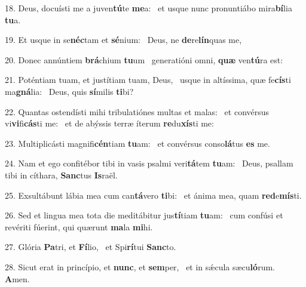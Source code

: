 18. Deus, docuísti me a juven\textbf{tú}te \textbf{me}a: \ast\  et usque nunc pronuntiábo mira\textbf{bí}lia \textbf{tu}a.\

19. Et usque in se\textbf{néc}tam et \textbf{sé}nium: \ast\  Deus, ne \textbf{de}re\textbf{lín}quas me,\

20. Donec annúntiem \textbf{brá}chium \textbf{tu}um \ast\  generatióni omni, \textbf{quæ} ven\textbf{tú}ra est:\

21. Poténtiam tuam, et justítiam tuam, Deus, \dag\  usque in altíssima, quæ fe\textbf{cís}ti ma\textbf{gná}lia: \ast\  Deus, quis \textbf{sí}milis \textbf{ti}bi?\

22. Quantas ostendísti mihi tribulatiónes multas et malas: \dag\  et convérsus vi\textbf{vi}fi\textbf{cás}ti me: \ast\  et de abýssis terræ íterum \textbf{re}du\textbf{xís}ti me:\

23. Multiplicásti magnifi\textbf{cén}tiam \textbf{tu}am: \ast\  et convérsus conso\textbf{lá}tus \textbf{es} me.\

24. Nam et ego confitébor tibi in vasis psalmi veri\textbf{tá}tem \textbf{tu}am: \ast\  Deus, psallam tibi in cíthara, \textbf{Sanc}tus \textbf{Is}raël.\

25. Exsultábunt lábia mea cum can\textbf{tá}vero \textbf{ti}bi: \ast\  et ánima mea, quam \textbf{red}e\textbf{mís}ti.\

26. Sed et lingua mea tota die meditábitur jus\textbf{tí}tiam \textbf{tu}am: \ast\  cum confúsi et revériti fúerint, qui quærunt \textbf{ma}la \textbf{mi}hi.\

27. Glória \textbf{Pa}tri, et \textbf{Fí}lio, \ast\  et Spi\textbf{rí}tui \textbf{Sanc}to.\

28. Sicut erat in princípio, et \textbf{nunc}, et \textbf{sem}per, \ast\  et in sǽcula sæcu\textbf{ló}rum. \textbf{A}men.\

